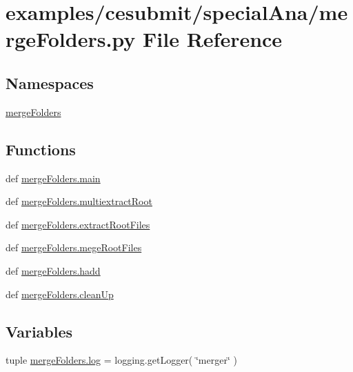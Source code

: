 \section{examples/cesubmit/special\-Ana/merge\-Folders.py File Reference}
\label{mergeFolders_8py}
\subsection*{Namespaces}
\begin{DoxyCompactItemize}
\item 
\hyperlink{namespacemergeFolders}{merge\-Folders}
\end{DoxyCompactItemize}
\subsection*{Functions}
\begin{DoxyCompactItemize}
\item 
def \hyperlink{namespacemergeFolders_af74fe5bebb563ab9a895921a28948f16}{merge\-Folders.\-main}
\item 
def \hyperlink{namespacemergeFolders_a7c6366a9ce2f411123ae3b25df78933f}{merge\-Folders.\-multiextract\-Root}
\item 
def \hyperlink{namespacemergeFolders_a96475809e86255995ef564058887d39f}{merge\-Folders.\-extract\-Root\-Files}
\item 
def \hyperlink{namespacemergeFolders_a832956bd7a1a5407aa19a59d731c2752}{merge\-Folders.\-mege\-Root\-Files}
\item 
def \hyperlink{namespacemergeFolders_af92fcbf0ab57c32eb46521a1fb694216}{merge\-Folders.\-hadd}
\item 
def \hyperlink{namespacemergeFolders_acd3e01a1c13b9e1d4b580609a3baf74f}{merge\-Folders.\-clean\-Up}
\end{DoxyCompactItemize}
\subsection*{Variables}
\begin{DoxyCompactItemize}
\item 
tuple \hyperlink{namespacemergeFolders_a9710f29dc48e47ab9175d312159798b1}{merge\-Folders.\-log} = logging.\-get\-Logger( \char`\"{}merger\char`\"{} )
\end{DoxyCompactItemize}
